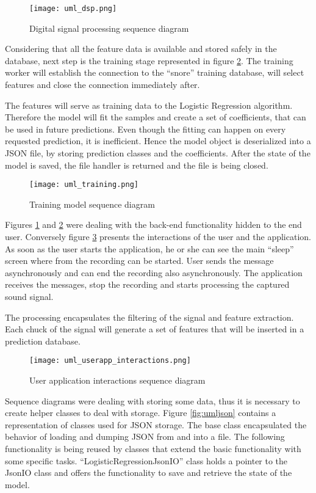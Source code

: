 \begin{figure}[!ht]
\centering
  \texttt{[image: uml\_dsp.png]}
\caption{Digital signal processing sequence diagram}
\label{fig:umldsp}
\end{figure}

Considering that all the feature data is available and stored safely in the database, next step is the training stage represented in figure \ref{fig:umltraining}. The training worker will establish the connection to the ``snore'' training database, will select features and close the connection immediately after. 

The features will serve as training data to the Logistic Regression algorithm. Therefore the model will fit the samples and create a set of coefficients, that can be used in future predictions. Even though the fitting can happen on every requested prediction, it is inefficient. Hence the model object is deserialized into a JSON file, by storing prediction classes and the coefficients. After the state of the model is saved, the file handler is returned and the file is being closed. 

\begin{figure}[!ht]
\centering
  \texttt{[image: uml\_training.png]}
\caption{Training model sequence diagram}
\label{fig:umltraining}
\end{figure}

Figures \ref{fig:umldsp} and \ref{fig:umltraining} were dealing with the back-end functionality hidden to the end user. Conversely figure \ref{fig:umluserapp} presents the interactions of the user and the application. As soon as the user starts the application, he or she can see the main ``sleep'' screen where from the recording can be started. User sends the message asynchronously and can end the recording also asynchronously. The application receives the messages, stop the recording and starts processing the captured sound signal. 

The processing encapsulates the filtering of the signal and feature extraction. Each chuck of the signal will generate a set of features that will be inserted in a prediction database. 

\begin{figure}[!ht]
\centering
  \texttt{[image: uml\_userapp\_interactions.png]}
\caption{User application interactions sequence diagram}
\label{fig:umluserapp}
\end{figure}

Sequence diagrams were dealing with storing some data, thus it is necessary to create helper classes to deal with storage. Figure \ref{fig:umljson} contains a representation of classes used for JSON storage. The base class encapsulated the behavior of loading and dumping JSON from and into a file. The following functionality is being reused by classes that extend the basic functionality with some specific tasks. ``LogisticRegressionJsonIO'' class holds a pointer to the JsonIO class and offers the functionality to save and retrieve the state of the model.

